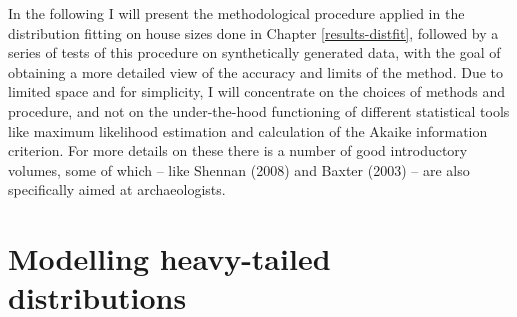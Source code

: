 \documentclass[
  12pt,
]{book}
\begin{document}
In the following I will present the methodological procedure applied in the distribution fitting on house sizes done in Chapter \ref{results-distfit}, followed by a series of tests of this procedure on synthetically generated data, with the goal of obtaining a more detailed view of the accuracy and limits of the method. Due to limited space and for simplicity, I will concentrate on the choices of methods and procedure, and not on the under-the-hood functioning of different statistical tools like maximum likelihood estimation and calculation of the Akaike information criterion. For more details on these there is a number of good introductory volumes, some of which -- like Shennan (2008) and Baxter (2003) -- are also specifically aimed at archaeologists.

\hypertarget{modelling-heavy-tailed-distributions}{%
\section{Modelling heavy-tailed distributions}\label{modelling-heavy-tailed-distributions}}
\end{document}
